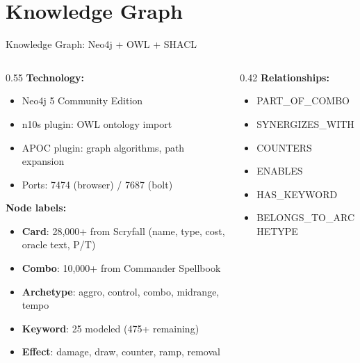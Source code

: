 \documentclass[aspectratio=169, 10pt]{beamer}
\begin{document}
\section{Knowledge Graph}

\begin{frame}{Knowledge Graph: Neo4j + OWL + SHACL}
  \begin{columns}[T]
    \begin{column}{0.55\textwidth}
      \footnotesize
      \textbf{Technology:}
      \begin{itemize}\scriptsize
        \item Neo4j 5 Community Edition
        \item n10s plugin: OWL ontology import
        \item APOC plugin: graph algorithms, path expansion
        \item Ports: 7474 (browser) / 7687 (bolt)
      \end{itemize}
      \vspace{0.15cm}
      \textbf{Node labels:}
      \begin{itemize}\scriptsize
        \item \textbf{Card}: 28,000+ from Scryfall (name, type, cost, oracle text, P/T)
        \item \textbf{Combo}: 10,000+ from Commander Spellbook
        \item \textbf{Archetype}: aggro, control, combo, midrange, tempo
        \item \textbf{Keyword}: 25 modeled (475+ remaining)
        \item \textbf{Effect}: damage, draw, counter, ramp, removal
      \end{itemize}
    \end{column}
    \begin{column}{0.42\textwidth}
      \footnotesize
      \textbf{Relationships:}
      \begin{itemize}\scriptsize
        \item PART\_OF\_COMBO
        \item SYNERGIZES\_WITH
        \item COUNTERS
        \item ENABLES
        \item HAS\_KEYWORD
        \item BELONGS\_TO\_ARCHETYPE

\end{itemize}
\end{column}
\end{columns}
\end{frame}
\end{document}
